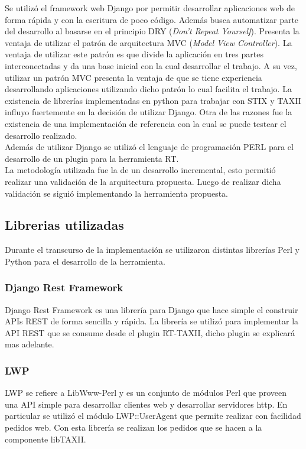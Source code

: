 Se utilizó el framework web Django por permitir desarrollar aplicaciones web de forma rápida y con la escritura de poco código. Además busca automatizar parte del desarrollo al basarse en el principio DRY (\textit{Don’t Repeat Yourself}). Presenta la ventaja de utilizar el patrón de arquitectura MVC (\textit{Model View Controller}). La ventaja de utilizar este patrón es que divide la aplicación en tres partes interconectadas y da una base inicial con la cual desarrollar el trabajo. A su vez, utilizar un patrón MVC presenta la ventaja de que se tiene experiencia desarrollando aplicaciones utilizando dicho patrón lo cual facilita el trabajo.
La existencia de librerías implementadas en python para trabajar con STIX y TAXII influyo fuertemente en la decisión de utilizar Django. Otra de las razones fue la existencia de una implementación de referencia con la cual se puede testear el desarrollo realizado.\\
	\bigskip
Además de utilizar Django se utilizó el lenguaje de programación PERL para el desarrollo de un plugin para la herramienta RT.\\

	\bigskip
La metodología utilizada fue la de un desarrollo incremental, esto permitió realizar una validación de la arquitectura propuesta. Luego de realizar dicha validación se siguió implementando la herramienta propuesta.

\subsection{Librerias utilizadas}
Durante el transcurso de la implementación se utilizaron distintas librerías Perl y Python para el desarrollo de la herramienta.

\subsubsection{Django Rest Framework}
Django Rest Framework \cite{rest_framework} es una librería para Django que hace simple el construir APIs REST de forma sencilla y rápida. La librería se utilizó para implementar la API REST que se consume desde el plugin RT-TAXII, dicho plugin se explicará mas adelante.

\subsubsection{LWP}
LWP se refiere a LibWww-Perl \cite{lwp} y es un conjunto de módulos Perl que proveen una API simple para desarrollar clientes web y desarrollar servidores http. En particular se utilizó el módulo LWP::UserAgent que permite realizar con facilidad pedidos web.
Con esta librería se realizan los pedidos que se hacen a la componente  libTAXII.

